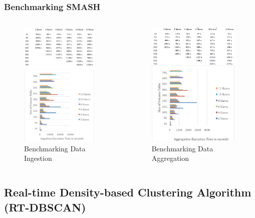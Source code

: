 \begin{frame}
    \frametitle{Benchmarking SMASH}
    \begin{columns}
             \vspace{-0.5cm}
             \begin{figure}
                 \centering
                 \includegraphics[height=6cm]{resource/figures/benchmark_ingest.png}
                 \vspace{-0.4cm}
                 \caption{\tiny Benchmarking Data Ingestion}
             \end{figure}
             \vspace{-0.5cm}
             \begin{figure}
                 \centering
                 \includegraphics[height=6cm]{resource/figures/benchmark_aggregate.png}
                 \vspace{-0.4cm}
                 \caption{\tiny Benchmarking Data Aggregation}
             \end{figure}
    \end{columns}
\end{frame}

\subsection{Real-time Density-based Clustering Algorithm (RT-DBSCAN)}

